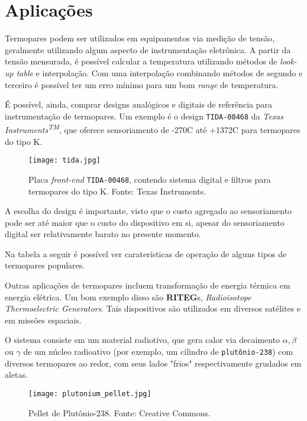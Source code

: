 \documentclass[a4paper,12pt]{report}
\begin{document}
	\pagebreak
	
	\section{Aplicações}
	
	Termopares podem ser utilizados em equipamentos via medição de tensão, geralmente utilizando algum aspecto de instrumentação eletrônica. A partir da tensão mensurada, é possível calcular a temperatura utilizando métodos de \textit{look-up table} e interpolação. Com uma interpolação combinando métodos de segundo e terceiro é possível ter um erro mínimo para um bom \textit{range} de temperatura. 
	
	É possível, ainda, comprar designs analógicos e digitais de referência para instrumentação de termopares. Um exemplo é o design \texttt{TIDA-00468} da \textit{Texas Instruments\textsuperscript{TM}}, que oferece sensoriamento de -270\degree C até +1372\degree C para termopares do tipo K.
	
	\begin{figure}[H]
		\centering
		\texttt{[image: tida.jpg]}\\
		\caption{Placa \textit{front-end} \texttt{TIDA-00468}, contendo sistema digital e filtros para termopares do tipo K. Fonte: Texas Instruments.}
	\end{figure}
	
	A escolha do design é importante, visto que o custo agregado ao sensoriamento pode ser até maior que o custo do dispositivo em si, apesar do sensoriamento digital ser relativamente barato no presente momento.
	
	Na tabela a seguir é possível ver caraterísticas de operação de alguns tipos de termopares populares.
	
	Outras aplicações de termopares incluem transformação de energia térmica em energia elétrica. Um bom exemplo disso são \textbf{RITEG}s, \textit{Radioisotope Thermoelectric Generators}. Tais dispositivos são utilizados em diversos satélites e em missões espaciais. 
	
	O sistema consiste em um material radiotivo, que gera calor via decaimento $\alpha, \beta$ ou $\gamma$ de um núcleo radioativo (por exemplo, um cilindro de \texttt{plutônio-238}) com diversos termopares ao redor, com seus lados "frios" respectivamente grudados em aletas.
	
	\begin{figure}[H]
		\centering
		\texttt{[image: plutonium\_pellet.jpg]}\\
		\caption{Pellet de Plutônio-238. Fonte: Creative Commons.}
	\end{figure}
\end{document}
